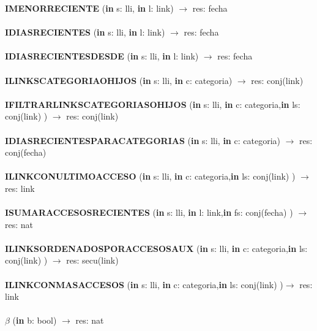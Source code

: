 \documentclass[10pt, a4paper]{article}
\begin{document}
	\textbf{IMENORRECIENTE} (\textbf{in} s: lli, \textbf{in} l: link) $\longrightarrow$ res: fecha\\\\
		
	\textbf{IDIASRECIENTES} (\textbf{in} s: lli, \textbf{in} l: link) $\longrightarrow$ res: fecha\\\\
		
	\textbf{IDIASRECIENTESDESDE} (\textbf{in} s: lli, \textbf{in} l: link) $\longrightarrow$ res: fecha\\\\
		
	\textbf{ILINKSCATEGORIAOHIJOS} (\textbf{in} s: lli, \textbf{in} c: categoria) $\longrightarrow$ res: conj(link)\\\\
		
	\textbf{IFILTRARLINKSCATEGORIASOHIJOS} (\textbf{in} s: lli, \textbf{in} c: categoria,\textbf{in} ls: conj(link) ) $\longrightarrow$ res: conj(link)\\\\
	
	\textbf{IDIASRECIENTESPARACATEGORIAS} (\textbf{in} s: lli, \textbf{in} c: categoria) $\longrightarrow$ res: conj(fecha)\\\\
		
	\textbf{ILINKCONULTIMOACCESO} (\textbf{in} s: lli, \textbf{in} c: categoria,\textbf{in} ls: conj(link) ) $\longrightarrow$ res: link\\\\
		
	\textbf{ISUMARACCESOSRECIENTES} (\textbf{in} s: lli, \textbf{in} l: link,\textbf{in} fs: conj(fecha) ) $\longrightarrow$ res: nat\\\\
	
	\textbf{ILINKSORDENADOSPORACCESOSAUX} (\textbf{in} s: lli, \textbf{in} c: categoria,\textbf{in} ls: conj(link) ) $\longrightarrow$ res: secu(link)\\\\
		
	\textbf{ILINKCONMASACCESOS} (\textbf{in} s: lli, \textbf{in} c: categoria,\textbf{in} ls: conj(link) )$\longrightarrow$ res: link\\\\
		
	\textbf{$\beta$} (\textbf{in} b: bool) $\longrightarrow$ res: nat\\\\
	  
\end{document}
